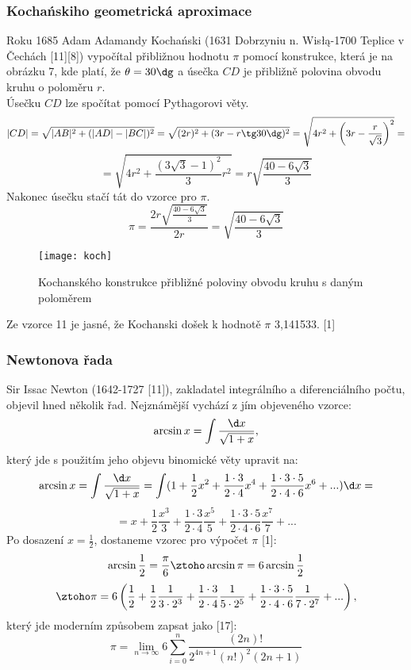 \documentclass[rocnikovka]{gzwroc} %
\begin{document}
\subsubsection{Kochańskiho geometrická aproximace}
Roku 1685 Adam Adamandy Kochański (1631 Dobrzyniu n. Wisłą-1700 Teplice v Čechách [11][8]) vypočítal přibližnou hodnotu $\pi$ pomocí konstrukce, která je na obrázku 7, kde platí, že $\theta =30\dg$ a úsečka $CD$ je přibližně polovina obvodu kruhu o poloměru $r$.\\
Úsečku $CD$ lze spočítat pomocí Pythagorovi věty.
$$ |CD|=\sqrt{|AB|^2+(|AD|-|BC|)^2}=\sqrt{(2r)^2+(3r-r\tg 30\dg)^2} = \sqrt{4r^2+\left(3r-\frac{r}{\sqrt{3}}\right)^2}= $$
\begin{equation}
=\sqrt{4r^2+\frac{(3\sqrt{3}-1)^2}{3}r^2} = r\sqrt{\frac{40-6\sqrt{3}}{3}}
\end{equation}
Nakonec úsečku stačí tát do vzorce pro $\pi$.
\begin{equation}
\pi=\frac{2r\sqrt{\frac{40-6\sqrt{3}}{3}}}{2r}=\sqrt{\frac{40-6\sqrt{3}}{3}}
\end{equation}
\begin{figure}[!ht]
\texttt{[image: koch]}
\caption{Kochanského konstrukce přibližné poloviny obvodu kruhu s daným poloměrem}
\label{fig:kruh}
\end{figure}
Ze vzorce 11 je jasné, že Kochanski došek k hodnotě $\pi$ 3,141533. [1]
\subsubsection{Newtonova řada}
Sir Issac Newton (1642-1727 [11]), zakladatel integrálního a diferenciálního počtu, objevil hned několik řad. Nejznámější vychází z jím objeveného vzorce:
$$
\arcsin x = \int \frac{\d x}{\sqrt{1+x}},
$$
který jde s použitím jeho objevu binomické věty upravit na:
$$
\arcsin x = \int \frac{\d x}{\sqrt{1+x}}=\int(1+\frac{1}{2}x^2+\frac{1\cdot3}{2\cdot4}x^4+\frac{1\cdot3\cdot5}{2\cdot4\cdot6}x^6+...)\d x=
$$
\begin{equation}
=x+\frac{1}{2}\frac{x^3}{3}+\frac{1\cdot3}{2\cdot4}\frac{x^5}{5}+\frac{1\cdot3\cdot5}{2\cdot4\cdot6}\frac{x^7}{7}+...
\end{equation}
Po dosazení $x=\frac{1}{2}$, dostaneme vzorec pro výpočet $\pi$ [1]:
$$
\arcsin \frac{1}{2}=\frac{\pi}{6} \ztoho \arcsin \pi=6\arcsin \frac{1}{2}
$$
\begin{equation}
\ztoho \pi=6\left(\frac{1}{2}+\frac{1}{2}\frac{1}{3\cdot2^3}+\frac{1\cdot3}{2\cdot4}\frac{1}{5\cdot2^5}+\frac{1\cdot3\cdot5}{2\cdot4\cdot6}\frac{1}{7\cdot2^7}+...\right),
\end{equation}
který jde moderním způsobem zapsat jako [17]:
\begin{equation}
\pi=\lim_{n\to\infty} 6\sum_{i=0}^{n} \frac{(2n)!}{2^{4n+1}(n!)^2(2n+1)}
\end{equation}
\end{document}
